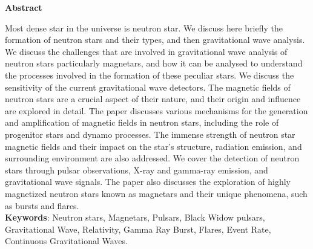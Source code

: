 \setcounter{page}{1}

    
\begin{center}
    \large{\textbf{Abstract}}
\end{center}

\noindent
Most dense star in the universe is neutron star. We discuss here briefly the formation of neutron stars and their types, and then gravitational wave analysis. We discuss the challenges that are involved in gravitational wave analysis of neutron stars particularly magnetars, and how it can be analysed to understand the processes involved in the formation of these peculiar stars. We discuss the sensitivity of the current gravitational wave detectors. The magnetic fields of neutron stars are a crucial aspect of their nature, and their origin and influence are explored in detail. The paper discusses various mechanisms for the generation and amplification of magnetic fields in neutron stars, including the role of progenitor stars and dynamo processes. The immense strength of neutron star magnetic fields and their impact on the star's structure, radiation emission, and surrounding environment are also addressed. We cover the detection of neutron stars through pulsar observations, X-ray and gamma-ray emission, and gravitational wave signals. The paper also discusses the exploration of highly magnetized neutron stars known as magnetars and their unique phenomena, such as bursts and flares.\\

\noindent
\textbf{Keywords}: Neutron stars, Magnetars, Pulsars, Black Widow pulsars, Gravitational Wave, Relativity, Gamma Ray Burst, Flares, Event Rate, Continuous Gravitational Waves.
